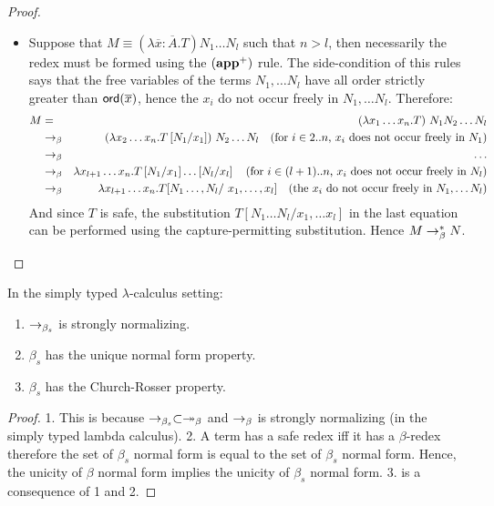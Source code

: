\begin{proof}
\begin{itemize}
\item Suppose that $M \equiv (\lambda \overline{x} : \overline{A} . T) N_1 \ldots N_l$ such that $n> l$, then necessarily
the redex must be formed using the $\mathbf{(app^+)}$ rule. The side-condition of this rules
says that the free variables of the terms $N_1, \ldots N_l$ have all order strictly greater than ${\sf ord}(\overline{x})$,
hence the $x_i$ do not occur freely in $N_1, \ldots N_l$. Therefore:
\begin{eqnarray*}
 M &=& (\lambda x_1 \ldots x_n .T) \ N_1  N_2 \ldots N_l  \\
     &\betared& (\lambda x_2 \ldots x_n .T \subst{N_1}{x_1} ) \ N_2 \ldots N_l
            \quad \mbox{(for $i \in 2..n$, $x_i$ does not occur freely in $N_1$)}\\
    &\betared& \ldots \\
    &\betared& \lambda x_{l+1} \ldots x_n . T \subst{N_1}{x_1}  \ldots \subst{N_l}{x_l}
        \quad \mbox{(for $i \in (l+1)..n$,  $x_i$ does not occur freely in $N_l$)}\\
    &\betared& \lambda x_{l+1} \ldots x_n . T [N_1\ldots, N_l /  \ x_1,\ldots, x_l]
        \quad \mbox{(the $x_i$ do not occur freely in $N_1, \ldots N_l$)}
\end{eqnarray*}
And since $T$ is safe, the substitution $T [N_1\ldots N_l/x_1,\ldots x_l]$ in the last equation
can be performed using the capture-permitting substitution. Hence $M \rightarrow_\beta^* N$.
\end{itemize}
\end{proof}

\begin{property} In the simply typed $\lambda$-calculus setting:
\begin{enumerate}
\item $\rightarrow_{\beta_s}$ is strongly normalizing.
\item $\beta_s$ has the unique normal form property.
\item $\beta_s$ has the Church-Rosser property.
\end{enumerate}
\end{property}

\begin{proof}
1. This is because $\rightarrow_{\beta_s} \subset \twoheadrightarrow_\beta$ and $\rightarrow_\beta$ is strongly normalizing (in the simply typed lambda calculus).
2. A term has a safe redex iff it has a $\beta$-redex therefore
the set of $\beta_s$ normal form is equal to the set of $\beta_s$
normal form. Hence, the unicity of $\beta$ normal form implies the
unicity of $\beta_s$ normal form.
3. is a consequence of 1 and 2.
\end{proof}


